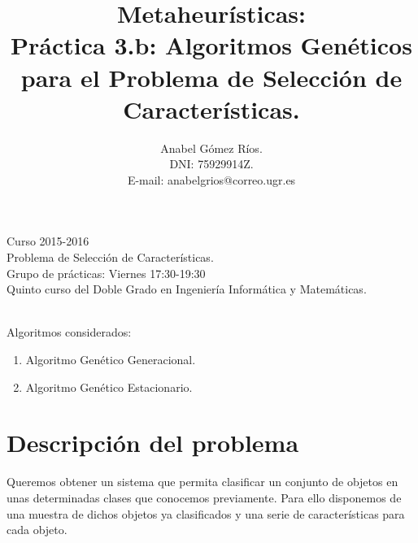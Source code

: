 \documentclass[12pt]{article}
\title{Metaheur\'isticas:\\
 Pr\'actica 3.b: Algoritmos Genéticos para el Problema de Selección de Características.}
\author{Anabel G\'omez R\'ios.\\
 DNI: 75929914Z.\\
 E-mail: anabelgrios@correo.ugr.es}
\begin{document}
\maketitle

\begin{center}
Curso 2015-2016\\

Problema de Selección de Características.\\ 

Grupo de prácticas: Viernes 17:30-19:30\\

Quinto curso del Doble Grado en Ingeniería Informática y Matemáticas.\\
\textit{ }\\
\end{center}

Algoritmos considerados:
\begin{enumerate}
\item Algoritmo Genético Generacional.
\item Algoritmo Genético Estacionario.
\end{enumerate}

\newpage

\tableofcontents

\newpage

\section{Descripción del problema}
Queremos obtener un sistema que permita clasificar un conjunto de objetos en unas determinadas clases que conocemos previamente. Para ello disponemos de una muestra de dichos objetos ya clasificados y una serie de características para cada objeto.\\
\end{document}
